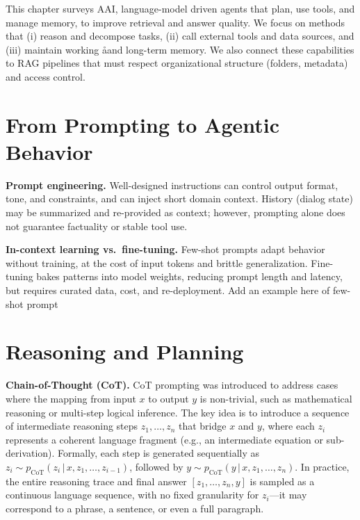 \label{chap:sota-agentic-ai}
\cleardoublepage

This chapter surveys \ac{AAI}, language-model driven agents that plan, use tools, and manage memory, to improve retrieval and answer quality. We focus on methods that (i) reason and decompose tasks, (ii) call external tools and data sources, and (iii) maintain working åand long-term memory. We also connect these capabilities to \ac{RAG} pipelines that must respect organizational structure (folders, metadata) and access control.

\section{From Prompting to Agentic Behavior}
\textbf{Prompt engineering.} Well-designed instructions can control output format, tone, and constraints, and can inject short domain context. History (dialog state) may be summarized and re-provided as context; however, prompting alone does not guarantee factuality or stable tool use.

\textbf{In-context learning vs.\ fine-tuning.} Few-shot prompts adapt behavior without training, at the cost of input tokens and brittle generalization. Fine-tuning bakes patterns into model weights, reducing prompt length and latency, but requires curated data, cost, and re-deployment.
Add an example here of few-shot prompt

\section{Reasoning and Planning}
\textbf{Chain-of-Thought (CoT).} CoT prompting was introduced to address cases where the mapping from input $x$ to output $y$ is non-trivial, such as mathematical reasoning or multi-step logical inference. The key idea is to introduce a sequence of intermediate reasoning steps $z_{1}, \dots, z_{n}$ that bridge $x$ and $y$, where each $z_{i}$ represents a coherent language fragment (e.g., an intermediate equation or sub-derivation). Formally, each step is generated sequentially as $z_{i} \sim p_{\text{CoT}}(z_{i}\,|\,x, z_{1},\dots,z_{i-1})$, followed by $y \sim p_{\text{CoT}}(y\,|\,x, z_{1},\dots,z_{n})$. In practice, the entire reasoning trace and final answer $[z_{1}, \dots, z_{n}, y]$ is sampled as a continuous language sequence, with no fixed granularity for $z_{i}$—it may correspond to a phrase, a sentence, or even a full paragraph.

